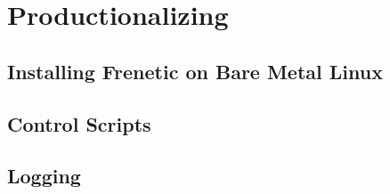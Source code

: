\chapter{Productionalizing}

\section{Installing Frenetic on Bare Metal Linux}
 \label{productionalizing:install}

\section{Control Scripts}

\section{Logging}
